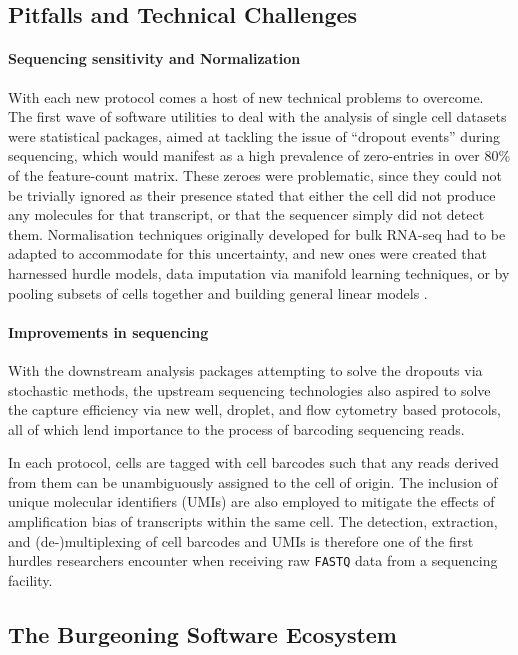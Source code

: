 \documentclass[a4paper,num-refs]{oup-contemporary}
\newcommand{\fileformat}[1]{\texttt{#1}} %
\begin{document}
\subsection{Pitfalls and Technical Challenges}

\paragraph{Sequencing sensitivity and Normalization}
With each new protocol comes a host of new technical problems to overcome. The first wave of software utilities to deal with the analysis of single cell datasets were statistical packages, aimed at tackling the issue of ``dropout events'' during sequencing, which would manifest as a high prevalence of zero-entries in over 80\% of the feature-count matrix. These zeroes were problematic, since they could not be trivially ignored as their presence stated that either the cell did not produce any molecules for that transcript, or that the sequencer simply did not detect them. Normalisation techniques originally developed for bulk RNA-seq had to be adapted to accommodate for this uncertainty, and new ones were created that harnessed hurdle models, data imputation via manifold learning techniques, or by pooling subsets of cells together and building general linear models \citep{camara2018methods}.

\paragraph{Improvements in sequencing}
With the downstream analysis packages attempting to solve the dropouts via stochastic methods, the upstream sequencing technologies also aspired to solve the capture efficiency via new well, droplet, and flow cytometry based protocols, all of which lend importance to the process of barcoding sequencing reads.

In each protocol, cells are tagged with cell barcodes such that any reads derived from them can be unambiguously assigned to the cell of origin. The inclusion of unique molecular identifiers (UMIs) are also employed to mitigate the effects of amplification bias of transcripts within the same cell. The detection, extraction, and (de-)multiplexing of cell barcodes and UMIs is therefore one of the first hurdles researchers encounter when receiving raw \fileformat{FASTQ} data from a sequencing facility.


\subsection{The Burgeoning Software Ecosystem}
\end{document}
